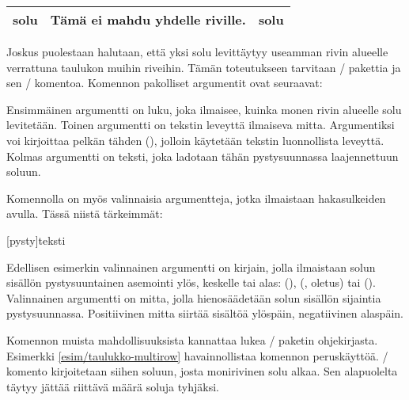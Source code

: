 \begin{tulossis}
  \renewcommand{\arraystretch}{1.2}
  \begin{tabular}{|l|p{6.5em}|l|}
    \hline solu & Tämä ei mahdu yhdelle riville. & solu \\ \hline
  \end{tabular}
\end{tulossis}

Joskus puolestaan halutaan, että yksi solu levittäytyy useamman rivin
alueelle verrattuna taulukon muihin riveihin. Tämän toteutukseen
tarvitaan \-/ pakettia ja sen \-/
komentoa. Komennon pakolliset argumentit ovat seuraavat:

\begin{koodilohkosis}
\end{koodilohkosis}

Ensimmäinen argumentti  on luku, joka ilmaisee, kuinka monen
rivin alueelle solu levitetään. Toinen argumentti  on
tekstin leveyttä ilmaiseva mitta. Argumentiksi voi kirjoittaa pelkän
tähden (\koodi{*}), jolloin käytetään tekstin luonnollista leveyttä.
Kolmas argumentti on teksti, joka ladotaan tähän pystysuunnassa
laajennettuun soluun.

Komennolla on myös valinnaisia argumentteja, jotka ilmaistaan
hakasulkeiden avulla. Tässä niistä tärkeimmät:

\begin{koodilohkosis}
[pysty]{teksti}
\end{koodilohkosis}

Edellisen esimerkin valinnainen argumentti  on kirjain,
jolla ilmaistaan solun sisällön pystysuuntainen asemointi ylös, keskelle
tai alas:  (),  (,
oletus) tai  (). Valinnainen argumentti
 on mitta, jolla hienosäädetään solun sisällön sijaintia
pystysuunnassa. Positiivinen mitta siirtää sisältöä ylöspäin,
negatiivinen alaspäin.

Komennon muista mahdollisuuksista kannattaa lukea \-/
paketin ohjekirjasta. Esimerkki \ref{esim/taulukko-multirow}
havainnollistaa komennon peruskäyttöä. \-/ komento
kirjoitetaan siihen soluun, josta monirivinen solu alkaa. Sen
alapuolelta täytyy jättää riittävä määrä soluja tyhjäksi.

